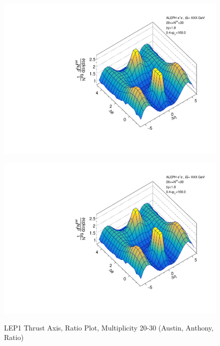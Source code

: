 \begin{figure}[htbp]
  \caption{LEP1 Thrust Axis, Ratio Plot, Multiplicity 20-30 (Austin, Anthony, Ratio)}
  \begin{minipage}[b]{0.32\linewidth}
    \centering
    \includegraphics[width=\linewidth]{images/TwoParticleCorrelation/LEP1_THRUST/LEP1_THRUST_ratio1_20_30.pdf}
    \label{fig:LEP1 Thrust Axis, Ratio Plot, Multiplicity 20-30, Austin}
  \end{minipage}
  \hspace{0.0cm}
  \begin{minipage}[b]{0.32\linewidth}
    \centering
    \includegraphics[width=\linewidth]{images/TwoParticleCorrelation/LEP1_THRUST/LEP1_THRUST_ratio2_20_30.pdf}
    \label{fig:LEP1 Thrust Axis, Ratio Plot, Multiplicity 20-30, Anthony}

\end{minipage}
\end{figure}
